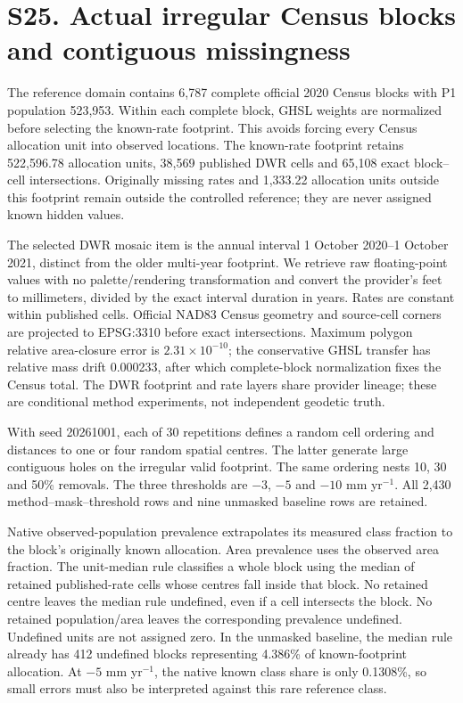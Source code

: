 \clearpage
\section*{S25. Actual irregular Census blocks and contiguous missingness}
The reference domain contains 6,787 complete official 2020 Census blocks with P1 population 523,953. Within each complete block, GHSL weights are normalized before selecting the known-rate footprint. This avoids forcing every Census allocation unit into observed locations. The known-rate footprint retains 522,596.78 allocation units, 38,569 published DWR cells and 65,108 exact block--cell intersections. Originally missing rates and 1,333.22 allocation units outside this footprint remain outside the controlled reference; they are never assigned known hidden values.

The selected DWR mosaic item is the annual interval 1 October 2020--1 October 2021, distinct from the older multi-year footprint. We retrieve raw floating-point values with no palette/rendering transformation and convert the provider's feet to millimeters, divided by the exact interval duration in years. Rates are constant within published cells. Official NAD83 Census geometry and source-cell corners are projected to EPSG:3310 before exact intersections. Maximum polygon relative area-closure error is $2.31\times10^{-10}$; the conservative GHSL transfer has relative mass drift 0.000233, after which complete-block normalization fixes the Census total. The DWR footprint and rate layers share provider lineage; these are conditional method experiments, not independent geodetic truth.

With seed 20261001, each of 30 repetitions defines a random cell ordering and distances to one or four random spatial centres. The latter generate large contiguous holes on the irregular valid footprint. The same ordering nests 10, 30 and 50\% removals. The three thresholds are $-3$, $-5$ and $-10$ mm yr$^{-1}$. All 2,430 method--mask--threshold rows and nine unmasked baseline rows are retained.

Native observed-population prevalence extrapolates its measured class fraction to the block's originally known allocation. Area prevalence uses the observed area fraction. The unit-median rule classifies a whole block using the median of retained published-rate cells whose centres fall inside that block. No retained centre leaves the median rule undefined, even if a cell intersects the block. No retained population/area leaves the corresponding prevalence undefined. Undefined units are not assigned zero. In the unmasked baseline, the median rule already has 412 undefined blocks representing 4.386\% of known-footprint allocation. At $-5$ mm yr$^{-1}$, the native known class share is only 0.1308\%, so small errors must also be interpreted against this rare reference class.

